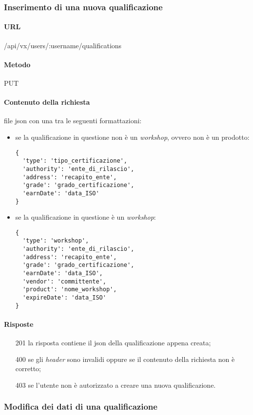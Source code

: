 \subsubsection{Inserimento di una nuova qualificazione}
\paragraph{URL}
/api/vx/users/:username/qualifications
\paragraph{Metodo}
PUT
\paragraph{Contenuto della richiesta}
file \gls{json} con una tra le seguenti formattazioni:
\begin{itemize}
\item se la qualificazione in questione non è un \emph{workshop}, ovvero non è un prodotto:
\begin{verbatim}
{
  'type': 'tipo_certificazione',
  'authority': 'ente_di_rilascio',
  'address': 'recapito_ente',
  'grade': 'grado_certificazione',
  'earnDate': 'data_ISO'
}
\end{verbatim}
\item se la qualificazione in questione è un \emph{workshop}:
\begin{verbatim}
{
  'type': 'workshop',
  'authority': 'ente_di_rilascio',
  'address': 'recapito_ente',
  'grade': 'grado_certificazione',
  'earnDate': 'data_ISO',
  'vendor': 'committente',
  'product': 'nome_workshop',
  'expireDate': 'data_ISO'
}
\end{verbatim}
\end{itemize}
\paragraph{Risposte}
\begin{itemize}
	\item[201] la risposta contiene il \gls{json} della qualificazione appena creata;
	\item[400] se gli \emph{header} sono invalidi oppure se il contenuto della richiesta non è corretto;
	\item[403] se l'utente non è autorizzato a creare una nuova qualificazione.
\end{itemize}

\subsubsection{Modifica dei dati di una qualificazione}
